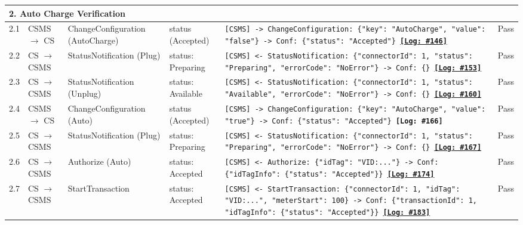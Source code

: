 \documentclass[10pt, a4paper, landscape]{article}
\begin{document}
\begin{longtable}{|p{1.0cm}|p{2.5cm}|p{4.0cm}|p{5.0cm}|p{10.0cm}|c|}
\multicolumn{6}{|l|}{\cellcolor{blue!10}\textbf{2. Auto Charge Verification}} \\
\hline
2.1 & CSMS $\to$ CS & ChangeConfiguration (AutoCharge) & status (Accepted) & \footnotesize\texttt{[CSMS] -> ChangeConfiguration: \{"key": "AutoCharge", "value": "false"\} \newline [CS] -> Conf: \{"status": "Accepted"\} \newline \hyperref[log:2.1]{\textbf{[Log: \#146]}}} & Pass \\
\hline
2.2 & CS $\to$ CSMS & StatusNotification (Plug) & status: Preparing & \footnotesize\texttt{[CSMS] <- StatusNotification: \{"connectorId": 1, "status": "Preparing", "errorCode": "NoError"\} \newline [CSMS] -> Conf: \{\} \newline \hyperref[log:2.2]{\textbf{[Log: \#153]}}} & Pass \\
\hline
2.3 & CS $\to$ CSMS & StatusNotification (Unplug) & status: Available & \footnotesize\texttt{[CSMS] <- StatusNotification: \{"connectorId": 1, "status": "Available", "errorCode": "NoError"\} \newline [CSMS] -> Conf: \{\} \newline \hyperref[log:2.3]{\textbf{[Log: \#160]}}} & Pass \\
\hline
2.4 & CSMS $\to$ CS & ChangeConfiguration (Auto) & status (Accepted) & \footnotesize\texttt{[CSMS] -> ChangeConfiguration: \{"key": "AutoCharge", "value": "true"\} \newline [CS] -> Conf: \{"status": "Accepted"\} \newline \textbf{[Log: \#166]}} & Pass \\
\hline
2.5 & CS $\to$ CSMS & StatusNotification (Plug) & status: Preparing & \footnotesize\texttt{[CSMS] <- StatusNotification: \{"connectorId": 1, "status": "Preparing", "errorCode": "NoError"\} \newline [CSMS] -> Conf: \{\} \newline \hyperref[log:2.5]{\textbf{[Log: \#167]}}} & Pass \\
\hline
2.6 & CS $\to$ CSMS & Authorize (Auto) & status: Accepted & \footnotesize\texttt{[CSMS] <- Authorize: \{"idTag": "VID:..."\} \newline [CSMS] -> Conf: \{"idTagInfo": \{"status": "Accepted"\}\} \newline \hyperref[log:2.6]{\textbf{[Log: \#174]}}} & Pass \\
\hline
2.7 & CS $\to$ CSMS & StartTransaction & status: Accepted & \footnotesize\texttt{[CSMS] <- StartTransaction: \{"connectorId": 1, "idTag": "VID:...", "meterStart": 100\} \newline [CSMS] -> Conf: \{"transactionId": 1, "idTagInfo": \{"status": "Accepted"\}\} \newline \hyperref[log:2.7]{\textbf{[Log: \#183]}}} & Pass \\

\end{longtable}
\end{document}
